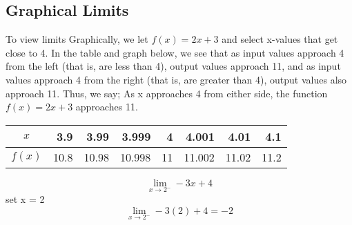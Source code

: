 \documentclass{report}
\begin{document}
\subsection{Graphical Limits}
\bigbreak \noindent
To view limits Graphically, we let $f(x) = 2x+3$ and select x-values that get close to 4. In the table and graph below, we see that as input values approach 4 from the left (that is, are less than 4), output values approach 11, and as input values approach 4 from the right (that is, are greater than 4), output values also approach 11. Thus, we say;
\bigbreak \noindent
As x approaches 4 from either side, the function $f(x) = 2x+3$ approaches 11.
\begin{figure}[ht]
    \centering
\end{figure}
\bigbreak \noindent
\begin{center}
\begin{tabular}{|c|r|r|r|r|r|r|r|}
  \hline
$x$ & 3.9 & 3.99 & 3.999 & 4 & 4.001 & 4.01 & 4.1 \\
\hline$f(x)$ & 10.8 & 10.98 & 10.998 & 11 & 11.002 & 11.02 & 11.2 \\
\hline
\end{tabular}
\end{center}

\pagebreak
{}
\bigbreak \noindent
\sol{}
\bigbreak \noindent

$$\displaystyle\lim_{x\to2^-}-3x+4$$
\noindent set x = 2
$$\displaystyle\lim_{x\to2^-}-3(2) +4 = -2$$
\vspace{2mm}
\end{document}
